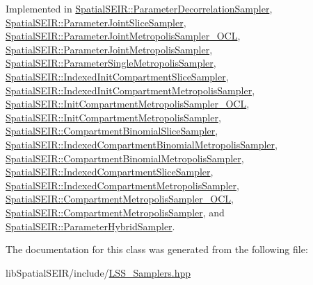 Implemented in \hyperlink{classSpatialSEIR_1_1ParameterDecorrelationSampler_ad3039ef7f917ec85fc210be2940b5da1}{Spatial\-S\-E\-I\-R\-::\-Parameter\-Decorrelation\-Sampler}, \hyperlink{classSpatialSEIR_1_1ParameterJointSliceSampler_ac435f72bd91e0585b45d42233b0741dc}{Spatial\-S\-E\-I\-R\-::\-Parameter\-Joint\-Slice\-Sampler}, \hyperlink{classSpatialSEIR_1_1ParameterJointMetropolisSampler__OCL_a1049eea747bcdaa8112defcc52a651d5}{Spatial\-S\-E\-I\-R\-::\-Parameter\-Joint\-Metropolis\-Sampler\-\_\-\-O\-C\-L}, \hyperlink{classSpatialSEIR_1_1ParameterJointMetropolisSampler_a5684e2933ff1fab50e1761450ba41897}{Spatial\-S\-E\-I\-R\-::\-Parameter\-Joint\-Metropolis\-Sampler}, \hyperlink{classSpatialSEIR_1_1ParameterSingleMetropolisSampler_a0576cfdda14e0afb0f63413f01a82c13}{Spatial\-S\-E\-I\-R\-::\-Parameter\-Single\-Metropolis\-Sampler}, \hyperlink{classSpatialSEIR_1_1IndexedInitCompartmentSliceSampler_a8687c4d1acc384cc4e8d7f4b91db79a5}{Spatial\-S\-E\-I\-R\-::\-Indexed\-Init\-Compartment\-Slice\-Sampler}, \hyperlink{classSpatialSEIR_1_1IndexedInitCompartmentMetropolisSampler_af2891523864f89b9587205eaba4bd41a}{Spatial\-S\-E\-I\-R\-::\-Indexed\-Init\-Compartment\-Metropolis\-Sampler}, \hyperlink{classSpatialSEIR_1_1InitCompartmentMetropolisSampler__OCL_a932637bc74c6f2f5fc251dd4a81131ae}{Spatial\-S\-E\-I\-R\-::\-Init\-Compartment\-Metropolis\-Sampler\-\_\-\-O\-C\-L}, \hyperlink{classSpatialSEIR_1_1InitCompartmentMetropolisSampler_ad64b5ae0943c980f752c49f9c179a3b7}{Spatial\-S\-E\-I\-R\-::\-Init\-Compartment\-Metropolis\-Sampler}, \hyperlink{classSpatialSEIR_1_1CompartmentBinomialSliceSampler_a35f2ba8531217f1fa227da3b801d05dd}{Spatial\-S\-E\-I\-R\-::\-Compartment\-Binomial\-Slice\-Sampler}, \hyperlink{classSpatialSEIR_1_1IndexedCompartmentBinomialMetropolisSampler_a2ce0af7bb2a881f254dfbd97584704bd}{Spatial\-S\-E\-I\-R\-::\-Indexed\-Compartment\-Binomial\-Metropolis\-Sampler}, \hyperlink{classSpatialSEIR_1_1CompartmentBinomialMetropolisSampler_aa84f51d4d02943be01c6309581ecc17a}{Spatial\-S\-E\-I\-R\-::\-Compartment\-Binomial\-Metropolis\-Sampler}, \hyperlink{classSpatialSEIR_1_1IndexedCompartmentSliceSampler_aeeeeb33f86bf684e6e44914c784847e6}{Spatial\-S\-E\-I\-R\-::\-Indexed\-Compartment\-Slice\-Sampler}, \hyperlink{classSpatialSEIR_1_1IndexedCompartmentMetropolisSampler_a87fe511f9a9fd517c4bafad59c296986}{Spatial\-S\-E\-I\-R\-::\-Indexed\-Compartment\-Metropolis\-Sampler}, \hyperlink{classSpatialSEIR_1_1CompartmentMetropolisSampler__OCL_a15b18cebae437f578fbf15aa8cfbdf94}{Spatial\-S\-E\-I\-R\-::\-Compartment\-Metropolis\-Sampler\-\_\-\-O\-C\-L}, \hyperlink{classSpatialSEIR_1_1CompartmentMetropolisSampler_a249b461e6f848c20f274bac7cae76e95}{Spatial\-S\-E\-I\-R\-::\-Compartment\-Metropolis\-Sampler}, and \hyperlink{classSpatialSEIR_1_1ParameterHybridSampler_ae5c2d418521cc111a5f6e92e995f823c}{Spatial\-S\-E\-I\-R\-::\-Parameter\-Hybrid\-Sampler}.



The documentation for this class was generated from the following file\-:\begin{DoxyCompactItemize}
\item 
lib\-Spatial\-S\-E\-I\-R/include/\hyperlink{LSS__Samplers_8hpp}{L\-S\-S\-\_\-\-Samplers.\-hpp}\end{DoxyCompactItemize}
